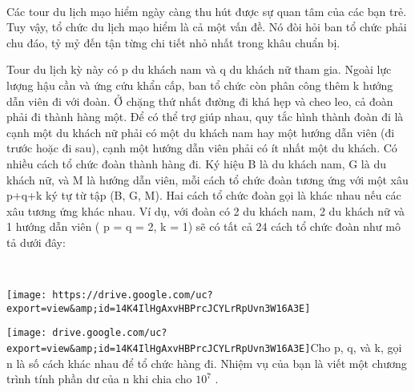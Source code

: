  

Các tour du lịch mạo hiểm ngày càng thu hút được sự quan tâm của các bạn trẻ. Tuy vậy, tổ chức du lịch mạo hiểm là cả một vấn đề. Nó đòi hỏi ban tổ chức phải chu đáo, tỷ mỷ đến tận từng chi tiết nhỏ nhất trong khâu chuẩn bị.

Tour du lịch kỳ này có p du khách nam và q du khách nữ tham gia. Ngoài lực lượng hậu cần và ứng cứu khẩn cấp, ban tổ chức còn phân công thêm k hướng dẫn viên đi với đoàn. Ở chặng thứ nhất đường đi khá hẹp và cheo leo, cả đoàn phải đi thành hàng một. Để có thể trợ giúp nhau, quy tắc hình thành đoàn đi là cạnh một du khách nữ phải có một du khách nam hay một hướng dẫn viên (đi trước hoặc đi sau), cạnh một hướng dẫn viên phải có ít nhất một du khách. Có nhiều cách tổ chức đoàn thành hàng đi. Ký hiệu B là du khách nam, G là du khách nữ, và M là hướng dẫn viên, mỗi cách tổ chức đoàn tương ứng với một xâu p+q+k ký tự từ tập (B, G, M). Hai cách tổ chức đoàn gọi là khác nhau nếu các xâu tương ứng khác nhau. Ví dụ, với đoàn có 2 du khách nam, 2 du khách nữ và 1 hướng dẫn viên ( p = q = 2, k = 1) sẽ có tất cả 24 cách tổ chức đoàn như mô tả dưới đây:

 


\texttt{[image: https://drive.google.com/uc?export=view\&amp;id=14K4IlHgAxvHBPrcJCYLrRpUvn3W16A3E]}


\texttt{[image: drive.google.com/uc?export=view\&amp;id=14K4IlHgAxvHBPrcJCYLrRpUvn3W16A3E]}Cho p, q, và k, gọi n là số cách khác nhau để tổ chức hàng đi. Nhiệm vụ của bạn là viết một chương trình tính phần dư của n khi chia cho $10^{7}$ .